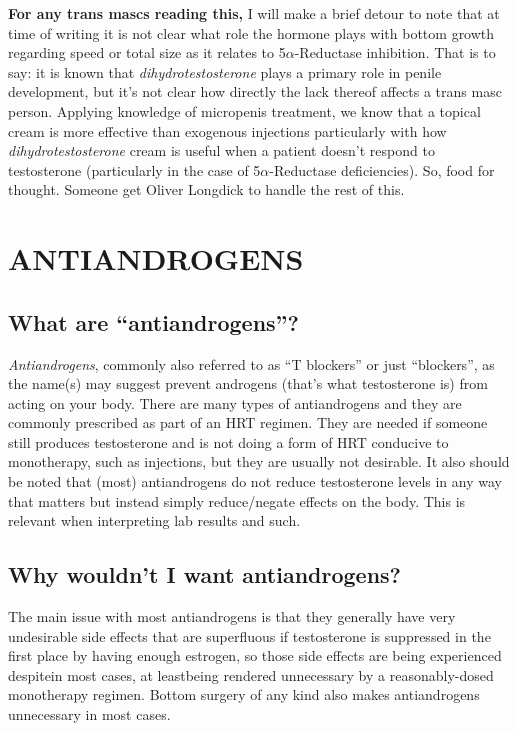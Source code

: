 \documentclass{article}
\begin{document}
\textbf{For any trans mascs reading this,} I will make a brief detour to note that at time of writing it is not clear what role the hormone plays with bottom growth regarding speed or total size as it relates to 5$\alpha$-Reductase inhibition. That is to say: it is known that \textit{dihydrotestosterone} plays a primary role in penile development, but it’s not clear how directly the lack thereof affects a trans masc person. Applying knowledge of micropenis treatment, we know that a topical cream is more effective than exogenous injections particularly with how \textit{dihydrotestosterone} cream is useful when a patient doesn’t respond to testosterone (particularly in the case of 5$\alpha$-Reductase deficiencies). So, food for thought. Someone get Oliver Longdick to handle the rest of this.



\section{ANTIANDROGENS}\label{AA}

\subsection{What are “antiandrogens”?}

\textit{Antiandrogens}, commonly also referred to as “T blockers” or just “blockers”, as the name(s) may suggest prevent androgens (that’s what testosterone is) from acting on your body. There are many types of antiandrogens and they are commonly prescribed as part of an HRT regimen. They are needed if someone still produces testosterone and is not doing a form of HRT conducive to monotherapy, such as injections, but they are usually not desirable. It also should be noted that (most) antiandrogens do not reduce testosterone levels in any way that matters but instead simply reduce/negate effects on the body. This is relevant when interpreting lab results and such.

\subsection{Why wouldn’t I want antiandrogens?}

The main issue with most antiandrogens is that they generally have very undesirable side effects that are superfluous if testosterone is suppressed in the first place by having enough estrogen, so those side effects are being experienced despite\textemdash{}in most cases, at least\textemdash{}being rendered unnecessary by a reasonably-dosed monotherapy regimen. Bottom surgery of any kind also makes antiandrogens unnecessary in most cases.
\end{document}
